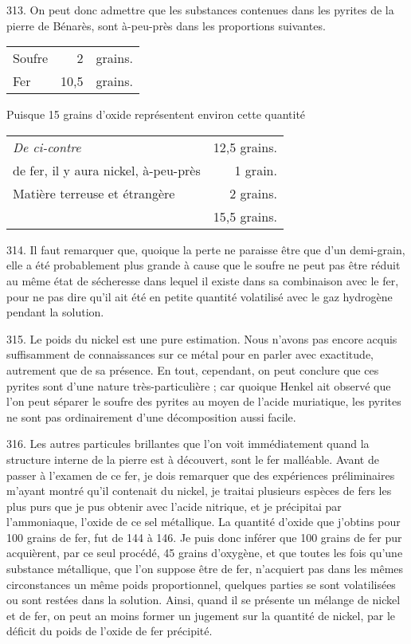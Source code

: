 \documentclass[a4paper, 11pt, oneside, polutonikogreek, french]{article}
\begin{document}
313. On peut donc admettre que les substances contenues dans les pyrites de la pierre de Bénarès, sont à-peu-près dans les proportions suivantes.

\begin{table}[!ht]
    \centering
    \Fontauri
    \Large
    \begin{tabular}{l r l}
        Soufre & 2 & grains. \\
        Fer & 10,5 & grains. \\
    \end{tabular}
\end{table}

Puisque 15 grains d'oxide représentent environ cette quantité

\begin{table}[!ht]
    \centering
    \Fontauri
    \Large
    \begin{tabular}{l r}
        \emph{De ci-contre} & 12,5 grains. \\
        de fer, il y aura nickel, à-peu-près & 1 grain. \\
        Matière terreuse et étrangère & 2 grains. \\ \hline
        ~ & 15,5 grains. \\
    \end{tabular}
\end{table}

314. Il faut remarquer que, quoique la perte ne paraisse être que d'un demi-grain, elle a été probablement plus grande à cause que le soufre ne peut pas être réduit au même état de sécheresse dans lequel il existe dans sa combinaison avec le fer, pour ne pas dire qu'il ait été en petite quantité volatilisé avec le gaz hydrogène pendant la solution.

315. Le poids du nickel est une pure estimation. Nous n'avons pas encore acquis suffisamment de connaissances sur ce métal pour en parler avec exactitude, autrement que de sa présence. En tout, cependant, on peut conclure que ces pyrites sont d'une nature très-particulière ; car quoique Henkel ait observé que l'on peut séparer le soufre des pyrites au moyen de l'acide muriatique, les pyrites ne sont pas ordinairement d'une décomposition aussi facile.

316. Les autres particules brillantes que l'on voit immédiatement quand la structure interne de la pierre est à découvert, sont le fer malléable. Avant de passer à l'examen de ce fer, je dois remarquer que des expériences préliminaires m'ayant montré qu'il contenait du nickel, je traitai plusieurs espèces de fers les plus purs que je pus obtenir avec l'acide nitrique, et je précipitai par l'ammoniaque, l'oxide de ce sel métallique. La quantité d'oxide que j'obtins pour 100 grains de fer, fut de 144 à 146. Je puis donc inférer que 100 grains de fer pur acquièrent, par ce seul procédé, 45 grains d'oxygène, et que toutes les fois qu'une substance métallique, que l'on suppose être de fer, n'acquiert pas dans les mêmes circonstances un même poids proportionnel, quelques parties se sont volatilisées ou sont restées dans la solution. Ainsi, quand il se présente un mélange de nickel et de fer, on peut an moins former un jugement sur la quantité de nickel, par le déficit du poids de l'oxide de fer précipité.
\end{document}
